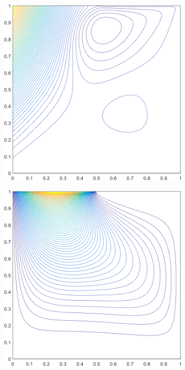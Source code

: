 \begin{figure}
{\begin{subfigure}[b]{0.375\textwidth}
	\end{subfigure}
}
\vspace{3mm}
{
	\begin{subfigure}[b]{0.375\textwidth}
		\centering
		\includegraphics[width=\textwidth]{figures/sec_BF/deg_square_MAXENT2_contour_b5.png}
	\end{subfigure}
	\hspace{1.5cm}
	\begin{subfigure}[b]{0.375\textwidth}
		\centering
		\includegraphics[width=\textwidth]{figures/sec_BF/deg_square_MAXENT2_contour_b9.png}

\end{subfigure}}
\end{figure}
